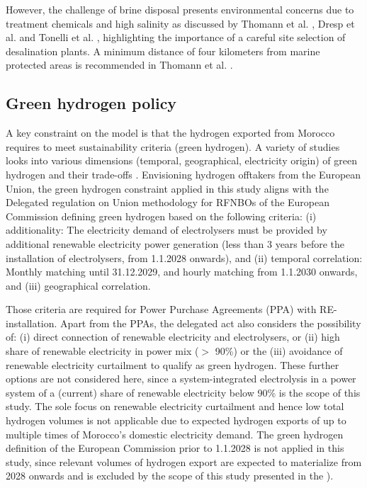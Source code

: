 \documentclass[5p,numafflabel]{elsarticle}
\begin{document}
However, the challenge of brine disposal presents environmental concerns due to treatment chemicals and high salinity as discussed by Thomann et al. \cite{Thomann2022}, Dresp et al. \cite{Dresp2019} and Tonelli et al. \cite{Tonelli2023}, highlighting the importance of a careful site selection of desalination plants. A minimum distance of four kilometers from marine protected areas is recommended in Thomann et al. \cite{Thomann2022}.



\subsection*{Green hydrogen policy}
\label{subsec:green_hydrogen_constraint}


A key constraint on the model is that the hydrogen exported from Morocco requires to meet sustainability criteria (green hydrogen). A variety of studies looks into various dimensions (temporal, geographical, electricity origin) of green hydrogen and their trade-offs \cite{Brauer2022, Ruhnau2023, Zeyen2024}.
Envisioning hydrogen offtakers from the European Union, the green hydrogen constraint applied in this study aligns with the Delegated regulation on Union methodology for RFNBOs of the European Commission \cite{Commission2023} defining green hydrogen based on the following criteria:
(i) additionality: The electricity demand of electrolysers must be provided by additional renewable electricity power generation (less than 3 years before the installation of electrolysers, from 1.1.2028 onwards), and
(ii) temporal correlation: Monthly matching until 31.12.2029, and hourly matching from 1.1.2030 onwards, and
(iii) geographical correlation.

Those criteria are required for Power Purchase Agreements (PPA) with RE-installation. Apart from the PPAs, the delegated act also considers the possibility of:
(i) direct connection of renewable electricity and electrolysers, or
(ii) high share of renewable electricity in power mix ($>$ 90\%) or the
(iii) avoidance of renewable electricity curtailment
to qualify as green hydrogen. These further options are not considered here, since a system-integrated electrolysis in a power system of a (current) share of renewable electricity below 90\% is the scope of this study. The sole focus on renewable electricity curtailment and hence low total hydrogen volumes is not applicable due to expected hydrogen exports of up to multiple times of Morocco's domestic electricity demand. The green hydrogen definition of the European Commission prior to 1.1.2028 is not applied in this study, since relevant volumes of hydrogen export are expected to materialize from 2028 onwards and is excluded by the scope of this study presented in the ).
\end{document}
